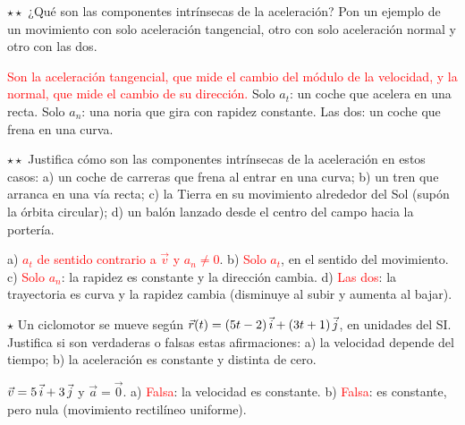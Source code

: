 \begin{exercise}
    \(\star\star\) ¿Qué son las componentes intrínsecas de la aceleración? Pon un ejemplo de un movimiento con solo aceleración
    tangencial, otro con solo aceleración normal y otro con las dos.
    \begin{solu}
        \textcolor{red}{Son la aceleración tangencial, que mide el cambio del módulo de la velocidad, y la normal, que mide el
        cambio de su dirección.} Solo \(a_t\): un coche que acelera en una recta. Solo \(a_n\): una noria que gira con rapidez
        constante. Las dos: un coche que frena en una curva.
    \end{solu}
\end{exercise}

\begin{exercise}
    \(\star\star\) Justifica cómo son las componentes intrínsecas de la aceleración en estos casos: a) un coche de carreras que
    frena al entrar en una curva; b) un tren que arranca en una vía recta; c) la Tierra en su movimiento alrededor del Sol
    (supón la órbita circular); d) un balón lanzado desde el centro del campo hacia la portería.
    \begin{solu}
        a) \textcolor{red}{\(a_t\) de sentido contrario a \(\vec v\) y \(a_n \neq 0\)}. b) \textcolor{red}{Solo \(a_t\)}, en el sentido
        del movimiento. c) \textcolor{red}{Solo \(a_n\)}: la rapidez es constante y la dirección cambia. d) \textcolor{red}{Las dos}:
        la trayectoria es curva y la rapidez cambia (disminuye al subir y aumenta al bajar).
    \end{solu}
\end{exercise}

\begin{exercise}
    \(\star\) Un ciclomotor se mueve según \(\vec r(t) = (5t - 2)\,\vec{i} + (3t + 1)\,\vec{j}\), en unidades del SI. Justifica si son
    verdaderas o falsas estas afirmaciones: a) la velocidad depende del tiempo; b) la aceleración es constante y distinta de cero.
    \begin{solu}
        \(\vec v = 5\,\vec{i} + 3\,\vec{j}\) y \(\vec a = \vec 0\). a) \textcolor{red}{Falsa}: la velocidad es constante.
        b) \textcolor{red}{Falsa}: es constante, pero nula (movimiento rectilíneo uniforme).
    \end{solu}
\end{exercise}

